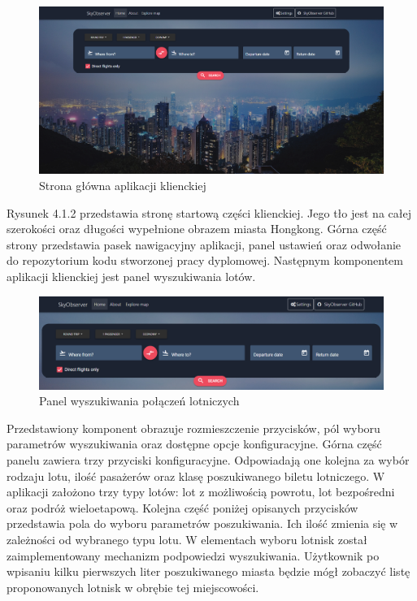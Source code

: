 \documentclass[12pt, twoside]{report}
\begin{document}
\begin{figure}[!ht]
\centering
\includegraphics[scale=0.32, keepaspectratio]{client_main_page.png}
\caption{Strona główna aplikacji klienckiej}
\label{fig:client_main_page}
\end{figure}
Rysunek 4.1.2 przedstawia stronę startową części klienckiej. Jego tło jest na całej szerokości oraz długości wypełnione obrazem miasta Hongkong. Górna część strony przedstawia pasek nawigacyjny aplikacji, panel ustawień oraz odwołanie do repozytorium kodu stworzonej pracy dyplomowej. Następnym komponentem aplikacji klienckiej jest panel wyszukiwania lotów.

\begin{figure}[!ht]
\centering
\includegraphics[scale=0.39, keepaspectratio]{search_panel.png}
\caption{Panel wyszukiwania połączeń lotniczych}
\label{fig:search_panel}
\end{figure}

Przedstawiony komponent obrazuje rozmieszczenie przycisków, pól wyboru parametrów wyszukiwania oraz dostępne opcje konfiguracyjne. Górna część panelu zawiera trzy przyciski konfiguracyjne. Odpowiadają one kolejna za wybór rodzaju lotu, ilość pasażerów oraz klasę poszukiwanego biletu lotniczego. W aplikacji założono trzy typy lotów: lot z możliwością powrotu, lot bezpośredni oraz podróż wieloetapową. Kolejna część poniżej opisanych przycisków przedstawia pola do wyboru parametrów poszukiwania. Ich ilość zmienia się w zależności od wybranego typu lotu.
\newpage
W elementach wyboru lotnisk został zaimplementowany mechanizm podpowiedzi wyszukiwania. Użytkownik po wpisaniu kilku pierwszych liter poszukiwanego miasta będzie mógł zobaczyć listę proponowanych lotnisk w obrębie tej miejscowości. 
\end{document}
